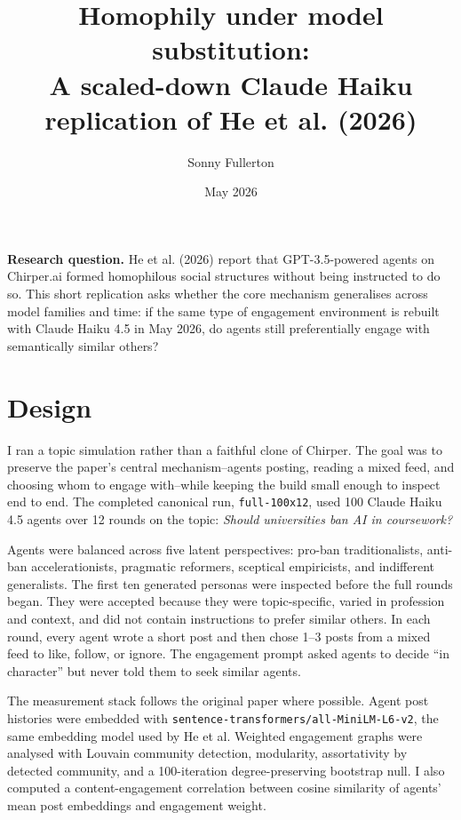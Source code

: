 \documentclass[10pt]{article}
\title{\vspace{-2em}Homophily under model substitution:\\
\large A scaled-down Claude Haiku replication of He et al. (2026)}
\author{Sonny Fullerton}
\date{May 2026}
\begin{document}
\maketitle
\vspace{-1.25em}

\textbf{Research question.} He et al. (2026) report that GPT-3.5-powered agents on Chirper.ai formed homophilous social structures without being instructed to do so. This short replication asks whether the core mechanism generalises across model families and time: if the same type of engagement environment is rebuilt with Claude Haiku 4.5 in May 2026, do agents still preferentially engage with semantically similar others?

\section*{Design}

I ran a topic simulation rather than a faithful clone of Chirper. The goal was to preserve the paper's central mechanism--agents posting, reading a mixed feed, and choosing whom to engage with--while keeping the build small enough to inspect end to end. The completed canonical run, \texttt{full-100x12}, used 100 Claude Haiku 4.5 agents over 12 rounds on the topic: \textit{Should universities ban AI in coursework?}

Agents were balanced across five latent perspectives: pro-ban traditionalists, anti-ban accelerationists, pragmatic reformers, sceptical empiricists, and indifferent generalists. The first ten generated personas were inspected before the full rounds began. They were accepted because they were topic-specific, varied in profession and context, and did not contain instructions to prefer similar others. In each round, every agent wrote a short post and then chose 1--3 posts from a mixed feed to like, follow, or ignore. The engagement prompt asked agents to decide ``in character'' but never told them to seek similar agents.

The measurement stack follows the original paper where possible. Agent post histories were embedded with \texttt{sentence-transformers/all-MiniLM-L6-v2}, the same embedding model used by He et al. Weighted engagement graphs were analysed with Louvain community detection, modularity, assortativity by detected community, and a 100-iteration degree-preserving bootstrap null. I also computed a content-engagement correlation between cosine similarity of agents' mean post embeddings and engagement weight.
\end{document}
